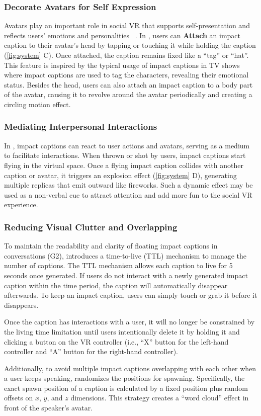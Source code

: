 \subsubsection{Decorate Avatars for Self Expression}
Avatars play an important role in social VR that supports self-presentation and reflects users' emotions and personalities ~\cite{sykownik2022something, freeman2021hugging}. 
In \system{}, users can \textbf{Attach} an impact caption to their avatar’s head by tapping or touching it while holding the caption (\autoref{fig:system} C). Once attached, the caption remains fixed like a ``tag'' or ``hat''. 
This feature is inspired by the typical usage of impact captions in TV shows where impact captions are used to tag the characters, revealing their emotional status. 
Besides the head, users can also attach an impact caption to a body part of the avatar, causing it to revolve around the avatar periodically and creating a circling motion effect.

\subsubsection{Mediating Interpersonal Interactions}
In \system{}, impact captions can react to user actions and avatars, serving as a medium to facilitate interactions.
When thrown or shot by users, impact captions start flying in the virtual space.
Once a flying impact caption collides with another caption or avatar, it triggers an explosion effect (\autoref{fig:system} D), generating multiple replicas that emit outward like fireworks.
Such a dynamic effect may be used as a non-verbal cue to attract attention and add more fun to the social VR experience.

\subsubsection{Reducing Visual Clutter and Overlapping}
\label{sec_visual_clutter}
To maintain the readability and clarity of floating impact captions in conversations (G2), \system{} introduces a time-to-live (TTL) mechanism to manage the number of captions.
The TTL mechanism allows each caption to live for 5 seconds once generated.
If users do not interact with a newly generated impact caption within the time period, the caption will automatically disappear afterwards. 
To keep an impact caption, users can simply touch or grab it before it disappears.

Once the caption has interactions with a user, it will no longer be constrained by the living time limitation until users intentionally delete it by holding it and clicking a button on the VR controller (i.e., ``X'' button for the left-hand controller and ``A'' button for the right-hand controller).

Additionally, to avoid multiple impact captions overlapping with each other when a user keeps speaking, \system{} randomizes the positions for spawning. Specifically, the exact spawn position of a caption is calculated by a fixed position plus random offsets on $x$, $y$, and $z$ dimensions. This strategy creates a ``word cloud'' effect in front of the speaker’s avatar.


